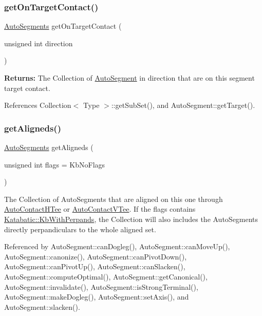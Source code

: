 \subsubsection{\texorpdfstring{get\+On\+Target\+Contact()}{getOnTargetContact()}}
{\footnotesize\ttfamily \mbox{\hyperlink{namespaceKatabatic_a2221b0ddbc24f331809fc86f98e38041}{Auto\+Segments}} get\+On\+Target\+Contact (\begin{DoxyParamCaption}\item[{unsigned int}]{direction }\end{DoxyParamCaption})}

{\bfseries Returns\+:} The Collection of \mbox{\hyperlink{classKatabatic_1_1AutoSegment}{Auto\+Segment}} in {\ttfamily direction} that are on this segment target contact. 

References Collection$<$ Type $>$\+::get\+Sub\+Set(), and Auto\+Segment\+::get\+Target().

\mbox{\label{classKatabatic_1_1AutoSegment_aaca749f49cd03ca06449d5ea2104033a}} 
\subsubsection{\texorpdfstring{get\+Aligneds()}{getAligneds()}}
{\footnotesize\ttfamily \mbox{\hyperlink{namespaceKatabatic_a2221b0ddbc24f331809fc86f98e38041}{Auto\+Segments}} get\+Aligneds (\begin{DoxyParamCaption}\item[{unsigned int}]{flags = {\ttfamily KbNoFlags} }\end{DoxyParamCaption})}

The Collection of Auto\+Segments that are aligned on this one through \mbox{\hyperlink{classKatabatic_1_1AutoContactHTee}{Auto\+Contact\+H\+Tee}} or \mbox{\hyperlink{classKatabatic_1_1AutoContactVTee}{Auto\+Contact\+V\+Tee}}. If the {\ttfamily flags} contains \mbox{\hyperlink{namespaceKatabatic_a2af2ad6b6441614038caf59d04b3b217ae2d033c8f78b61468c827de8db5fe839}{Katabatic\+::\+Kb\+With\+Perpands}}, the Collection will also includes the Auto\+Segments directly perpandiculars to the whole aligned set. 

Referenced by Auto\+Segment\+::can\+Dogleg(), Auto\+Segment\+::can\+Move\+Up(), Auto\+Segment\+::canonize(), Auto\+Segment\+::can\+Pivot\+Down(), Auto\+Segment\+::can\+Pivot\+Up(), Auto\+Segment\+::can\+Slacken(), Auto\+Segment\+::compute\+Optimal(), Auto\+Segment\+::get\+Canonical(), Auto\+Segment\+::invalidate(), Auto\+Segment\+::is\+Strong\+Terminal(), Auto\+Segment\+::make\+Dogleg(), Auto\+Segment\+::set\+Axis(), and Auto\+Segment\+::slacken().

